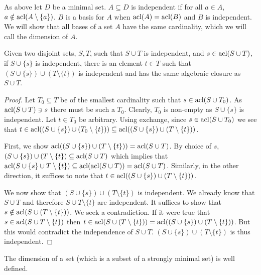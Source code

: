 \begin{definition}\label{definition_independence}
As above let \(D\) be a minimal set. \(A \subseteq D\) is independent if for all \(a \in A\), \(a \notin \text{acl}(A \setminus \{a\})\). 
\(B\) is a basis for \(A\) when \(\text{acl}(A) = \text{acl}(B)\) and \(B\) is independent.
We will show that all bases of a set \(A\)  have the same cardinality, which we will call the dimension of \(A\).
\end{definition}

\begin{lemma}\label{lemma_dimension}
Given two disjoint sets, \(S, T\), such that \(S \cup T\) is independent, and \(s \in \text{acl}(S \cup T)\), if \(S \cup \{s\}\) is independent, there is an element \(t \in T\) such that \((S \cup \{s\}) \cup (T \setminus \{t\})\) is independent and has the same algebraic closure as \(S \cup T\). 
\end{lemma}

\begin{proof}
Let \(T_0 \subseteq T\) be of the smallest cardinality such that \(s \in \text{acl}(S \cup T_0)\). 
As \(\text{acl}(S \cup T) \ni s\) there must be such a \(T_0\).
Clearly, \(T_0\) is non-empty as \(S \cup \{s\}\) is independent.
Let \(t \in T_0\) be arbitrary. 
Using exchange, since \(s \in \text{acl}(S \cup T_0)\) we see that \(t \in \text{acl}((S \cup \{s\}) \cup (T_0 \setminus \{t\})) \subseteq \text{acl}((S \cup \{s\}) \cup (T \setminus \{t\}))\).

First, we show \(\text{acl}((S \cup \{s\}) \cup (T \setminus \{t\})) = \text{acl}(S \cup T)\).
By choice of \(s\), \((S \cup \{s\}) \cup (T \setminus \{t\}) \subseteq \text{acl}(S \cup T)\) which implies that \(\text{acl}(S \cup \{s\} \cup T \setminus \{t\}) \subseteq \text{acl}(\text{acl}(S \cup T)) = \text{acl}(S \cup T)\).
Similarly, in the other direction, it suffices to note that \(t \in \text{acl}((S \cup \{s\}) \cup (T \setminus \{t\}))\).

We now show that \((S \cup \{s\}) \cup (T \setminus \{t\})\) is independent. 
We already know that \(S \cup T\) and therefore \(S \cup T \setminus \{t\}\) are independent. 
It suffices to show that \(s \notin \text{acl}(S \cup (T \setminus \{t\}))\).
We seek a contradiction. 
If it were true that \(s \in \text{acl}(S \cup T \setminus \{t\})\) then  \(t \in \text{acl}(S \cup (T \setminus \{t\})) = \text{acl}((S \cup \{s\}) \cup (T \setminus\{t\}))\).
But this would contradict the independence of \(S \cup T\). 
\((S \cup \{s\}) \cup (T \setminus \{t\})\) is thus independent. 
\end{proof}

\begin{theorem}\label{theorem_dimension}
The dimension of a set (which is a subset of a strongly minimal set) is well defined.
\end{theorem}

